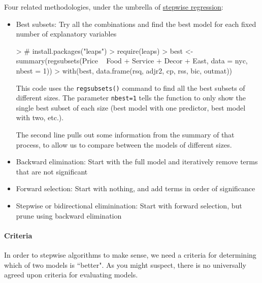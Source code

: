 \documentclass[10pt]{article}
\begin{document}
Four related methodologies, under the umbrella of \href{http://en.wikipedia.org/wiki/Stepwise_regression}{stepwise regression}:
		\begin{itemize}
			\item Best subsets: Try all the combinations and find the best model for each fixed number of explanatory variables

\begin{Schunk}
\begin{Sinput}
> # install.packages("leaps")
> require(leaps)
> best <- summary(regsubsets(Price ~ Food + Service + Decor + East, data = nyc, nbest = 1))
> with(best, data.frame(rsq, adjr2, cp, rss, bic, outmat))
\end{Sinput}
\end{Schunk}

This code uses the \texttt{regsubsets()} command to find all the best subsets of different sizes. The parameter \texttt{nbest=1} tells the function to only show the single best subset of each size (best model with one predictor, best model with two, etc.). 

The second line pulls out some information from the summary of that process, to allow us to compare between the models of different sizes. 

\item Backward elimination: Start with the full model and iteratively remove terms that are not significant




\item Forward selection: Start with nothing, and add terms in order of significance

\item Stepwise or bidirectional eliminination: Start with forward selection, but prune using backward elimination


\end{itemize}

\paragraph{Criteria}
In order to stepwise algorithms to make sense, we need a criteria for determining which of two models is ``better". As you might suspect, there is no universally agreed upon criteria for evaluating models.
\end{document}
